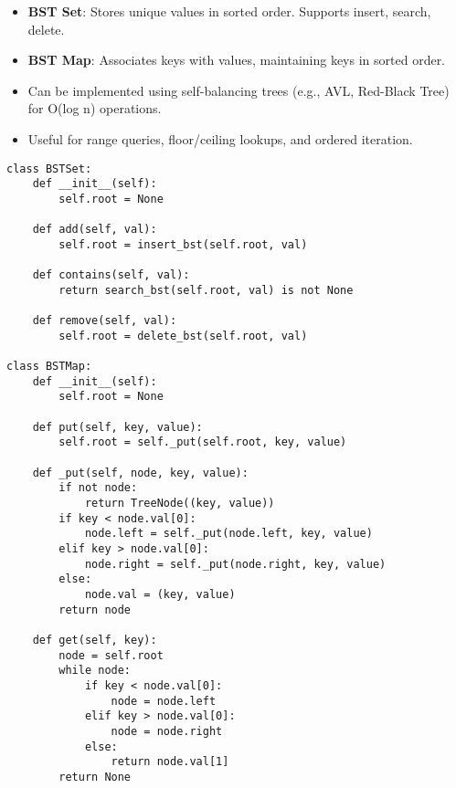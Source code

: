 \begin{summary}
    \begin{itemize}
        \item \textbf{BST Set}: Stores unique values in sorted order. Supports insert, search, delete.
        \item \textbf{BST Map}: Associates keys with values, maintaining keys in sorted order.
        \item Can be implemented using self-balancing trees (e.g., AVL, Red-Black Tree) for O(log n) operations.
        \item Useful for range queries, floor/ceiling lookups, and ordered iteration.
    \end{itemize}
\end{summary}

\begin{algo}
\begin{lstlisting}
class BSTSet:
    def __init__(self):
        self.root = None

    def add(self, val):
        self.root = insert_bst(self.root, val)

    def contains(self, val):
        return search_bst(self.root, val) is not None

    def remove(self, val):
        self.root = delete_bst(self.root, val)

class BSTMap:
    def __init__(self):
        self.root = None

    def put(self, key, value):
        self.root = self._put(self.root, key, value)

    def _put(self, node, key, value):
        if not node:
            return TreeNode((key, value))
        if key < node.val[0]:
            node.left = self._put(node.left, key, value)
        elif key > node.val[0]:
            node.right = self._put(node.right, key, value)
        else:
            node.val = (key, value)
        return node

    def get(self, key):
        node = self.root
        while node:
            if key < node.val[0]:
                node = node.left
            elif key > node.val[0]:
                node = node.right
            else:
                return node.val[1]
        return None
\end{lstlisting}
\end{algo}